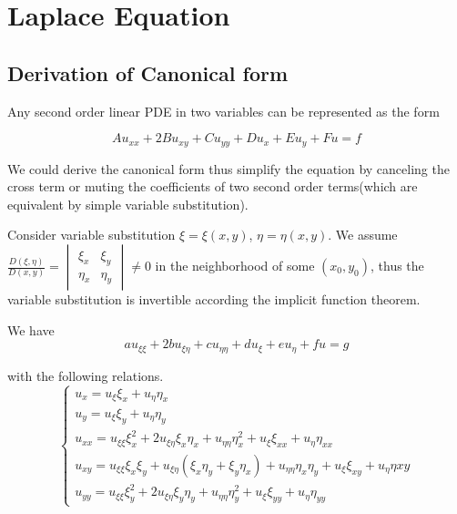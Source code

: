 \chapter{Laplace Equation}
	
	\section{Derivation of Canonical form}
	
	Any second order linear PDE in two variables can be represented as the form 
	
	\begin{equation}
		Au_{xx} + 2Bu_{xy} + Cu_{yy} + Du_x + Eu_y + Fu = f
		\label{second order linear PDE}
	\end{equation}
	
	We could derive the canonical form thus simplify the equation by canceling the cross term or muting the coefficients of two second order terms(which are equivalent by simple variable substitution).
	
	Consider variable substitution $\xi = \xi(x, y)$, $\eta = \eta(x, y)$. We assume $\frac{D(\xi, \eta)}{D(x, y)} = \begin{vmatrix}
		\xi_x & \xi_y \\
		\eta_x & \eta_y
	\end{vmatrix} \neq 0 $ in the neighborhood of some $(x_0, y_0)$, thus the variable substitution is invertible according the implicit function theorem.
	
	We have 
	\begin{equation}
		au_{\xi \xi} + 2bu_{\xi \eta} + cu_{\eta \eta} + du_{\xi} + eu_{\eta} + fu = g
		\label{common PDE with variable substitution}
	\end{equation}
	
	with the following relations.
	$$\begin{cases}
		u_x = u_{\xi}\xi_x + u_{\eta}\eta_x\\
		u_y = u_{\xi}\xi_y + u_{\eta}\eta_y\\
		u_{xx} = u_{\xi\xi}\xi_x^2 + 2u_{\xi\eta}\xi_x\eta_x + u_{\eta\eta}\eta_x^2 + u_{\xi}\xi_{xx} + u_{\eta}\eta_{xx}\\
		u_{xy} = u_{\xi\xi}\xi_x\xi_y + u_{\xi\eta}(\xi_x\eta_y + \xi_y\eta_x) + u_{\eta\eta}\eta_x\eta_y + u_{\xi}\xi_{xy} + u_{\eta}\eta{xy}\\
		u_{yy} = u_{\xi\xi}\xi_y^2 + 2u_{\xi\eta}\xi_y\eta_y + u_{\eta\eta}\eta_y^2 + u_{\xi}\xi_{yy} + u_{\eta}\eta_{yy}
	\end{cases}$$
	
